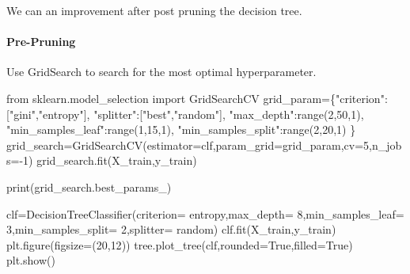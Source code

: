 \documentclass[
  letterpaper,
  DIV=11,
  numbers=noendperiod]{scrartcl}
\let\oldparagraph\paragraph
\renewcommand{\paragraph}[1]{\oldparagraph{#1}\mbox{}}
\newenvironment{Shaded}{\begin{snugshade}}{\end{snugshade}}
\newcommand{\BuiltInTok}[1]{\textcolor[rgb]{0.00,0.23,0.31}{#1}}
\newcommand{\DecValTok}[1]{\textcolor[rgb]{0.68,0.00,0.00}{#1}}
\newcommand{\ImportTok}[1]{\textcolor[rgb]{0.00,0.46,0.62}{#1}}
\newcommand{\NormalTok}[1]{\textcolor[rgb]{0.00,0.23,0.31}{#1}}
\newcommand{\OperatorTok}[1]{\textcolor[rgb]{0.37,0.37,0.37}{#1}}
\newcommand{\StringTok}[1]{\textcolor[rgb]{0.13,0.47,0.30}{#1}}
\newcommand{\VariableTok}[1]{\textcolor[rgb]{0.07,0.07,0.07}{#1}}
\begin{document}
We can an improvement after post pruning the decision tree.

\paragraph{Pre-Pruning}\label{pre-pruning}

Use GridSearch to search for the most optimal hyperparameter.

\begin{Shaded}
\begin{Highlighting}[]
\ImportTok{from}\NormalTok{ sklearn.model\_selection }\ImportTok{import}\NormalTok{ GridSearchCV}
\NormalTok{grid\_param}\OperatorTok{=}\NormalTok{\{}\StringTok{"criterion"}\NormalTok{:[}\StringTok{"gini"}\NormalTok{,}\StringTok{"entropy"}\NormalTok{],}
             \StringTok{"splitter"}\NormalTok{:[}\StringTok{"best"}\NormalTok{,}\StringTok{"random"}\NormalTok{],}
             \StringTok{"max\_depth"}\NormalTok{:}\BuiltInTok{range}\NormalTok{(}\DecValTok{2}\NormalTok{,}\DecValTok{50}\NormalTok{,}\DecValTok{1}\NormalTok{),}
             \StringTok{"min\_samples\_leaf"}\NormalTok{:}\BuiltInTok{range}\NormalTok{(}\DecValTok{1}\NormalTok{,}\DecValTok{15}\NormalTok{,}\DecValTok{1}\NormalTok{),}
             \StringTok{"min\_samples\_split"}\NormalTok{:}\BuiltInTok{range}\NormalTok{(}\DecValTok{2}\NormalTok{,}\DecValTok{20}\NormalTok{,}\DecValTok{1}\NormalTok{) }
\NormalTok{            \}}
\NormalTok{grid\_search}\OperatorTok{=}\NormalTok{GridSearchCV(estimator}\OperatorTok{=}\NormalTok{clf,param\_grid}\OperatorTok{=}\NormalTok{grid\_param,cv}\OperatorTok{=}\DecValTok{5}\NormalTok{,n\_jobs}\OperatorTok{={-}}\DecValTok{1}\NormalTok{)}
\NormalTok{grid\_search.fit(X\_train,y\_train)}
\end{Highlighting}
\end{Shaded}

\begin{Shaded}
\begin{Highlighting}[]
\BuiltInTok{print}\NormalTok{(grid\_search.best\_params\_)}
\end{Highlighting}
\end{Shaded}

\begin{Shaded}
\begin{Highlighting}[]
\NormalTok{clf}\OperatorTok{=}\NormalTok{DecisionTreeClassifier(criterion}\OperatorTok{=} \StringTok{\textquotesingle{}entropy\textquotesingle{}}\NormalTok{,max\_depth}\OperatorTok{=} \DecValTok{8}\NormalTok{,min\_samples\_leaf}\OperatorTok{=} \DecValTok{3}\NormalTok{,min\_samples\_split}\OperatorTok{=} \DecValTok{2}\NormalTok{,splitter}\OperatorTok{=} \StringTok{\textquotesingle{}random\textquotesingle{}}\NormalTok{)}
\NormalTok{clf.fit(X\_train,y\_train)}
\NormalTok{plt.figure(figsize}\OperatorTok{=}\NormalTok{(}\DecValTok{20}\NormalTok{,}\DecValTok{12}\NormalTok{))}
\NormalTok{tree.plot\_tree(clf,rounded}\OperatorTok{=}\VariableTok{True}\NormalTok{,filled}\OperatorTok{=}\VariableTok{True}\NormalTok{)}
\NormalTok{plt.show()}
\end{Highlighting}
\end{Shaded}
\end{document}
